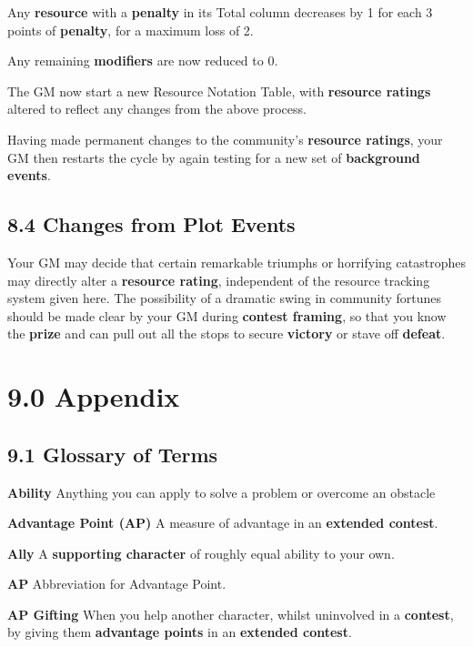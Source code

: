 \documentclass[
]{article}
\begin{document}
Any \textbf{resource} with a \textbf{penalty} in its Total column
decreases by 1 for each 3 points of \textbf{penalty}, for a maximum loss
of 2.

Any remaining \textbf{modifiers} are now reduced to 0.

The GM now start a new Resource Notation Table, with \textbf{resource
ratings} altered to reflect any changes from the above process.

Having made permanent changes to the community's \textbf{resource
ratings}, your GM then restarts the cycle by again testing for a new set
of \textbf{background events}.

\hypertarget{changes-from-plot-events}{%
\subsection{8.4 Changes from Plot
Events}\label{changes-from-plot-events}}

Your GM may decide that certain remarkable triumphs or horrifying
catastrophes may directly alter a \textbf{resource rating}, independent
of the resource tracking system given here. The possibility of a
dramatic swing in community fortunes should be made clear by your GM
during \textbf{contest framing}, so that you know the \textbf{prize} and
can pull out all the stops to secure \textbf{victory} or stave off
\textbf{defeat}.

\hypertarget{appendix}{%
\section{9.0 Appendix}\label{appendix}}

\hypertarget{glossary-of-terms}{%
\subsection{9.1 Glossary of Terms}\label{glossary-of-terms}}

\textbf{Ability} Anything you can apply to solve a problem or overcome
an obstacle

\textbf{Advantage Point (AP)} A measure of advantage in an
\textbf{extended contest}.

\textbf{Ally} A \textbf{supporting character} of roughly equal ability
to your own.

\textbf{AP} Abbreviation for Advantage Point.

\textbf{AP Gifting} When you help another character, whilst uninvolved
in a \textbf{contest}, by giving them \textbf{advantage points} in an
\textbf{extended contest}.
\end{document}
